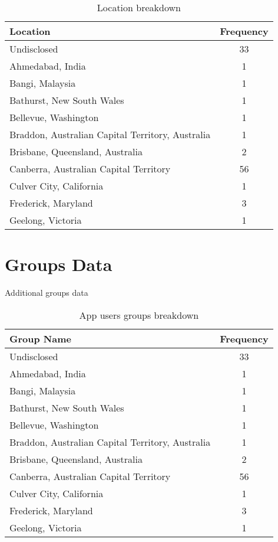 \begin{table}[!htbp]
\centering
	\begin{tabular}{|l|c|} %
		\hline
		\textbf{Location} & \textbf{Frequency}  \\ \hline
		Undisclosed & 33 \\ \hline
		Ahmedabad, India & 1 \\ \hline
		Bangi, Malaysia & 1 \\ \hline
		Bathurst, New South Wales & 1 \\ \hline
		Bellevue, Washington & 1 \\ \hline
		Braddon, Australian Capital Territory, Australia & 1 \\ \hline
		Brisbane, Queensland, Australia & 2 \\ \hline
		Canberra, Australian Capital Territory & 56 \\ \hline
		Culver City, California & 1 \\ \hline
		Frederick, Maryland & 3 \\ \hline
		Geelong, Victoria & 1 \\ \hline
	\end{tabular}
	\caption{Location breakdown}
	\label{tab:revpol}
\end{table}

\clearpage

\section{Groups Data}
\label{sec:groups}

Additional groups data

\begin{table}[!htbp]
\centering
	\begin{tabular}{|l|c|} %
		\hline
		\textbf{Group Name} & \textbf{Frequency}  \\ \hline
		Undisclosed & 33 \\ \hline
		Ahmedabad, India & 1 \\ \hline
		Bangi, Malaysia & 1 \\ \hline
		Bathurst, New South Wales & 1 \\ \hline
		Bellevue, Washington & 1 \\ \hline
		Braddon, Australian Capital Territory, Australia & 1 \\ \hline
		Brisbane, Queensland, Australia & 2 \\ \hline
		Canberra, Australian Capital Territory & 56 \\ \hline
		Culver City, California & 1 \\ \hline
		Frederick, Maryland & 3 \\ \hline
		Geelong, Victoria & 1 \\ \hline
	\end{tabular}
	\caption{App users groups breakdown}
	\label{tab:revpol}
\end{table}

